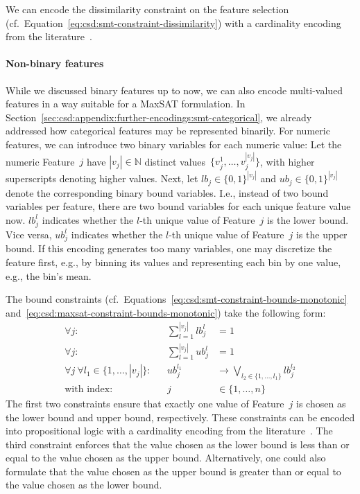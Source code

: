 \documentclass{article}
\theoremstyle{definition}
\begin{document}
We can encode the dissimilarity constraint on the feature selection (cf.~Equation~\ref{eq:csd:smt-constraint-dissimilarity}) with a cardinality encoding from the literature~\cite{sinz2005towards}.

\paragraph{Non-binary features}

While we discussed binary features up to now, we can also encode multi-valued features in a way suitable for a MaxSAT formulation.
In Section~\ref{sec:csd:appendix:further-encodings:smt-categorical}, we already addressed how categorical features may be represented binarily.
For numeric features, we can introduce two binary variables for each numeric value:
Let the numeric Feature~$j$ have $|v_j| \in \mathbb{N}$ distinct values~$\{v^1_j, \dots, v^{|v_j|}_j\}$, with higher superscripts denoting higher values.
Next, let $\mathit{lb}_j \in \{0, 1\}^{|v_j|}$ and $\mathit{ub}_j \in \{0, 1\}^{|v_j|}$ denote the corresponding binary bound variables.
I.e., instead of two bound variables per feature, there are two bound variables for each unique feature value now.
$\mathit{lb}^l_j$ indicates whether the $l$-th unique value of Feature~$j$ is the lower bound.
Vice versa, $\mathit{ub}^l_j$ indicates whether the $l$-th unique value of Feature~$j$ is the upper bound.
If this encoding generates too many variables, one may discretize the feature first, e.g., by binning its values and representing each bin by one value, e.g., the bin's mean.

The bound constraints (cf.~Equations~\ref{eq:csd:smt-constraint-bounds-monotonic} and~\ref{eq:csd:maxsat-constraint-bounds-monotonic}) take the following form:
%
\begin{equation}
	\begin{aligned}
		\forall j: & & \sum_{l=1}^{|v_j|} \mathit{lb}^l_j &= 1 \\
		\forall j: & & \sum_{l=1}^{|v_j|} \mathit{ub}^l_j &= 1 \\
		\forall j~ \forall l_1 \in \{1, \dots, |v_j|\}: & & \mathit{ub}^{l_1}_j &\rightarrow \bigvee_{l_2 \in \{1, \dots, l_1\}} \mathit{lb}^{l_2}_j \\
		\text{with index:} & & j &\in \{1, \dots, n\}
	\end{aligned}
	\label{eq:csd:maxsat-numeric-constraint-bounds-monotonic}
\end{equation}
%
The first two constraints ensure that exactly one value of Feature~$j$ is chosen as the lower bound and upper bound, respectively.
These constraints can be encoded into propositional logic with a cardinality encoding from the literature~\cite{sinz2005towards}.
The third constraint enforces that the value chosen as the lower bound is less than or equal to the value chosen as the upper bound.
Alternatively, one could also formulate that the value chosen as the upper bound is greater than or equal to the value chosen as the lower bound.
\end{document}
